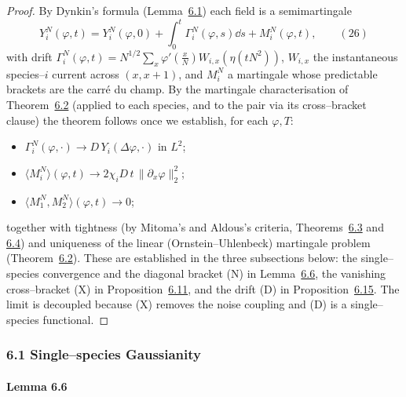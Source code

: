 \documentclass[11pt]{article}
\theoremstyle{plain}
\theoremstyle{definition}
\theoremstyle{remark}
\begin{document}
\begin{proof}
By Dynkin's formula (Lemma~\hyperref[lem_dynkin]{6.1}) each field is a semimartingale
\label{eq_dynkin}
\begin{equation}
  Y_i^N(\varphi,t)=Y_i^N(\varphi,0)+\int_0^t\Gamma_i^N(\varphi,s)\dd s+M_i^N(\varphi,t),\qquad(26)
\end{equation}
with drift $\Gamma_i^N(\varphi,t)=N^{1/2}\sum_x\varphi'(\tfrac xN)W_{i,x}(\eta(tN^2))$,
$W_{i,x}$ the instantaneous species--$i$ current across $(x,x{+}1)$, and $M_i^N$ a
martingale whose predictable brackets are the carr\'e du champ. By the martingale
characterisation of Theorem~\hyperref[thm_mp]{6.2} (applied to each species, and to the pair via
its cross--bracket clause) the theorem follows once we establish, for each $\varphi,T$:
\begin{itemize}
\item[\textup{(D)}] $\Gamma_i^N(\varphi,\cdot)\to D\,Y_i(\Delta\varphi,\cdot)$ in $L^2$;
\item[\textup{(N)}] $\langle M_i^N\rangle(\varphi,t)\to 2\chi_i D\,t\,\|\partial_x\varphi\|_2^2$;
\item[\textup{(X)}] $\langle M_1^N,M_2^N\rangle(\varphi,t)\to0$;
\end{itemize}
together with tightness (by Mitoma's and Aldous's criteria,
Theorems~\hyperref[thm_mitoma]{6.3} and \hyperref[prop_aldous]{6.4}) and uniqueness of the linear
(Ornstein--Uhlenbeck) martingale problem (Theorem~\hyperref[thm_mp]{6.2}). These
are established in the three subsections below: the single--species convergence and the
diagonal bracket (N) in Lemma~\hyperref[lem_gauss]{6.6}, the vanishing cross--bracket (X) in
Proposition~\hyperref[prop_conc]{6.11}, and the drift (D) in Proposition~\hyperref[prop_drift]{6.15}. The
limit is decoupled because (X) removes the noise coupling and (D) is a single--species
functional.
\end{proof}

\subsubsection{6.1 Single--species Gaussianity}
\paragraph{Lemma 6.6}\label{lem_gauss}
\end{document}
